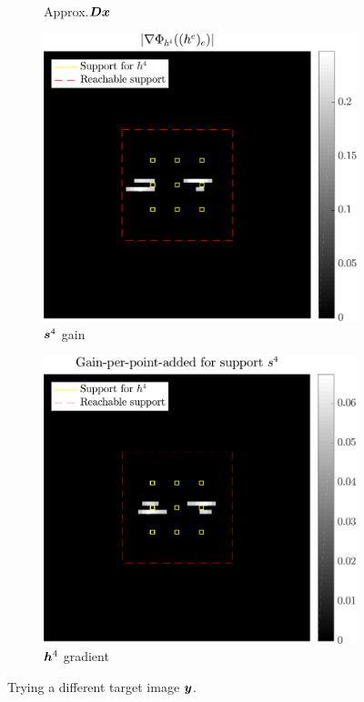 \begin{figure}[!h]
\begin{subfigure}[b]{0.22\textwidth}
	\caption{Approx.\@ $\bm{D}\bm{x}$}
	\end{subfigure}
	\begin{subfigure}[b]{0.26\textwidth}\centering
	\includegraphics[width=\textwidth]{figures/xp/tilted_n4/xp_128x128_sc2_angl4_K3_S3_node4_partgrad4_bestvalues.pdf}
	\caption{$\bm{s}^4$ gain}
	\end{subfigure}
	\begin{subfigure}[b]{0.26\textwidth}\centering
	\includegraphics[width=\textwidth]{figures/xp/tilted_n4/xp_128x128_sc2_angl4_K3_S3_node4_objmatrix_bestvalues.pdf}
	\caption{$\bm{h}^4$ gradient}
	\end{subfigure}
\caption{Trying a different target image $\bm{y}$.}\label{fig_gain_tilted_n4}
\end{figure}

